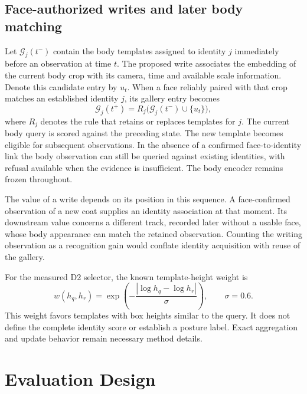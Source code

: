 \documentclass[journal,letterpaper]{IEEEtran}
\newcommand{\draftnote}[3]{\par\smallskip\noindent{\footnotesize
  \textcolor{editink}{\sffamily\bfseries [#2 #1]}\enspace
  \textcolor{editink}{#3}\par}\smallskip}
\newcommand{\methodgap}[2]{\draftnote{METHOD}{#1}{#2}}
\begin{document}
\subsection{Face-authorized writes and later body matching}
Let $\mathcal G_j(t^-)$ contain the body templates assigned to identity $j$ immediately before an observation at time $t$. The proposed write associates the embedding of the current body crop with its camera, time and available scale information. Denote this candidate entry by $u_t$. When a face reliably paired with that crop matches an established identity $j$, its gallery entry becomes
\begin{equation}
 \mathcal G_j(t^+)=R_j\bigl(\mathcal G_j(t^-)\cup\{u_t\}\bigr),
 \label{eq:update}
\end{equation}
where $R_j$ denotes the rule that retains or replaces templates for $j$. The current body query is scored against the preceding state. The new template becomes eligible for subsequent observations. In the absence of a confirmed face-to-identity link the body observation can still be queried against existing identities, with refusal available when the evidence is insufficient. The body encoder remains frozen throughout.

The value of a write depends on its position in this sequence. A face-confirmed observation of a new coat supplies an identity association at that moment. Its downstream value concerns a different track, recorded later without a usable face, whose body appearance can match the retained observation. Counting the writing observation as a recognition gain would conflate identity acquisition with reuse of the gallery.

For the measured D2 selector, the known template-height weight is
\begin{equation}
 w(h_q,h_r)=\exp\!\left(-\frac{|\log h_q-\log h_r|}{\sigma}\right),
 \qquad \sigma=0.6.
 \label{eq:height}
\end{equation}
This weight favors templates with box heights similar to the query. It does not define the complete identity score or establish a posture label. Exact aggregation and update behavior remain necessary method details.
\methodgap{M3}{Specify write, retention, deduplication and scoring rules, acceptance thresholds, face-reference refresh or expiry, new identities and how erroneous writes are corrected.}

\section{Evaluation Design}\label{sec:evaluation}
\end{document}
